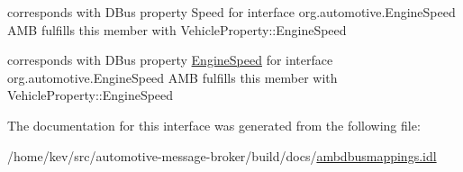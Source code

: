 corresponds with D\+Bus property Speed for interface org.\+automotive.\+Engine\+Speed A\+M\+B fulfills this member with Vehicle\+Property\+::\+Engine\+Speed 

corresponds with D\+Bus property \hyperlink{interfaceEngineSpeed}{Engine\+Speed} for interface org.\+automotive.\+Engine\+Speed A\+M\+B fulfills this member with Vehicle\+Property\+::\+Engine\+Speed 

The documentation for this interface was generated from the following file\+:\begin{DoxyCompactItemize}
\item 
/home/kev/src/automotive-\/message-\/broker/build/docs/\hyperlink{ambdbusmappings_8idl}{ambdbusmappings.\+idl}\end{DoxyCompactItemize}
